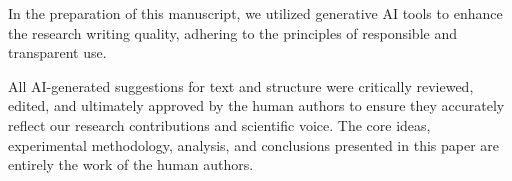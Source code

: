 \documentclass[sigconf, review]{acmart}
\begin{document}
In the preparation of this manuscript, we utilized generative AI tools to enhance the research writing quality, adhering to the principles of responsible and transparent use. 

All AI-generated suggestions for text and structure were critically
reviewed, edited, and ultimately approved by the human
authors to ensure they accurately reflect our research contributions
and scientific voice. The core ideas, experimental methodology,
analysis, and conclusions presented in this paper are entirely the
work of the human authors.




\end{document}
